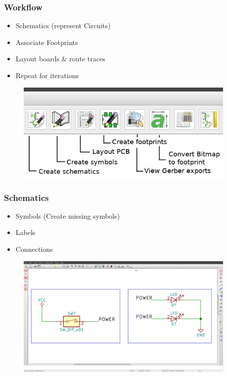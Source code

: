 \documentclass{beamer}
\begin{document}
\begin{frame}
  \frametitle{Workflow}
  \begin{itemize}
    \item Schematics (represent Circuits)
    \item Associate Footprints
    \item Layout boards \& route traces
    \item Repeat for iterations
  \end{itemize}

  \begin{figure}[H]
    \centering
    \includegraphics[width=0.95\textwidth]{images/workflow_overview.png}
  \end{figure}

\end{frame}


\begin{frame}
  \frametitle{Schematics}
  \begin{itemize}
    \item Symbols (Create missing symbols)
    \item Labels
    \item Connections
  \end{itemize}

  \begin{figure}[H]
    \centering
    \includegraphics[width=0.95\textwidth]{images/kicad_schematic.png}
  \end{figure}

\end{frame}
\end{document}
